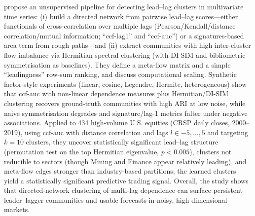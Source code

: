 \cite{bennett2022leadlag} propose an unsupervised pipeline for detecting lead–lag clusters in multivariate time series: (i) build a directed network from pairwise lead–lag scores—either functionals of cross-correlation over multiple lags (Pearson/Kendall/distance correlation/mutual information; “ccf-lag1” and “ccf-auc”) or a signatures-based area term from rough paths—and (ii) extract communities with high inter-cluster flow imbalance via Hermitian spectral clustering (with DI-SIM and bibliometric symmetrisation as baselines). They define a meta-flow matrix and a simple “leadingness” row-sum ranking, and discuss computational scaling. Synthetic factor-style experiments (linear, cosine, Legendre, Hermite, heterogeneous) show that ccf-auc with non-linear dependence measures plus Hermitian/DI-SIM clustering recovers ground-truth communities with high ARI at low noise, while naive symmetrisation degrades and signature/lag-1 metrics falter under negative associations. Applied to 434 high-volume U.S. equities (CRSP daily closes, 2000–2019), using ccf-auc with distance correlation and lags $l\in{-5,\dots,5}$ and targeting $k=10$ clusters, they uncover statistically significant lead–lag structure (permutation test on the top Hermitian eigenvalue, $p<0.005$), clusters not reducible to sectors (though Mining and Finance appear relatively leading), and meta-flow edges stronger than industry-based partitions; the learned clusters yield a statistically significant predictive trading signal. Overall, the study shows that directed-network clustering of multi-lag dependence can surface persistent leader–lagger communities and usable forecasts in noisy, high-dimensional markets.

